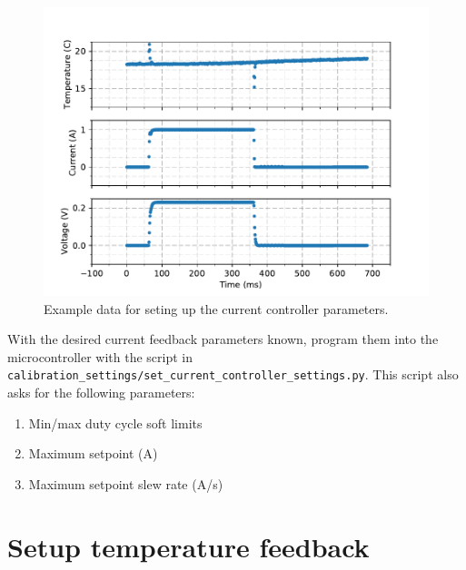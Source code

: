 \documentclass{article}
\begin{document}
\begin{figure}
    \center
    \includegraphics[scale=1]{figures/current_feedback_risetime_data_1.pdf} 
    \caption{Example data for seting up the current controller parameters.}
    \label{fig:current_feedback}
\end{figure}

With the desired current feedback parameters known, program them into the microcontroller with the script in \texttt{calibration\_settings/set\_current\_controller\_settings.py}. This script also asks for the following parameters:
\begin{enumerate}
\item Min/max duty cycle soft limits
\item Maximum setpoint (A)
\item Maximum setpoint slew rate (A/s)
\end{enumerate}


\clearpage
\section{Setup temperature feedback}
\end{document}
